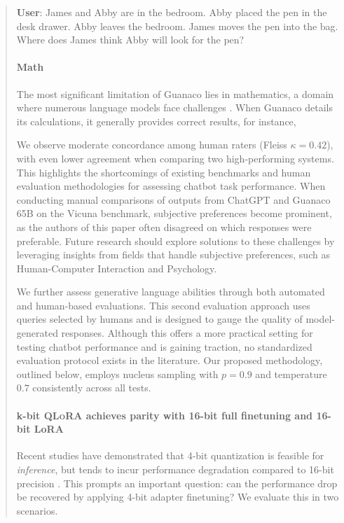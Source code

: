 \begin{quote}
    \textbf{User}: James and Abby are in the bedroom. Abby placed the pen in the desk drawer. Abby leaves the bedroom. James moves the pen into the bag. Where does James think Abby will look for the pen?

\paragraph{Math} The most significant limitation of {Guanaco} lies in mathematics, a domain where numerous language models face challenges \citep{liang2022holistic}. When {Guanaco} details its calculations, it generally provides correct results, for instance,

We observe moderate concordance among human raters (Fleiss $\kappa=0.42$), with even lower agreement when comparing two high-performing systems. This highlights the shortcomings of existing benchmarks and human evaluation methodologies for assessing chatbot task performance. When conducting manual comparisons of outputs from ChatGPT and {Guanaco} 65B on the Vicuna benchmark, subjective preferences become prominent, as the authors of this paper often disagreed on which responses were preferable. Future research should explore solutions to these challenges by leveraging insights from fields that handle subjective preferences, such as Human-Computer Interaction and Psychology.

We further assess generative language abilities through both automated and human-based evaluations. This second evaluation approach uses queries selected by humans and is designed to gauge the quality of model-generated responses. Although this offers a more practical setting for testing chatbot performance and is gaining traction, no standardized evaluation protocol exists in the literature. Our proposed methodology, outlined below, employs nucleus sampling with $p=0.9$ and temperature $0.7$ consistently across all tests.

\paragraph{k-bit \textsc{QLoRA} achieves parity with 16-bit full finetuning and 16-bit LoRA} Recent studies have demonstrated that 4-bit quantization is feasible for \emph{inference}, but tends to incur performance degradation compared to 16-bit precision \citep{dettmers2022case,frantar2022gptq}. This prompts an important question: can the performance drop be recovered by applying 4-bit adapter finetuning? We evaluate this in two scenarios.


\end{quote}
